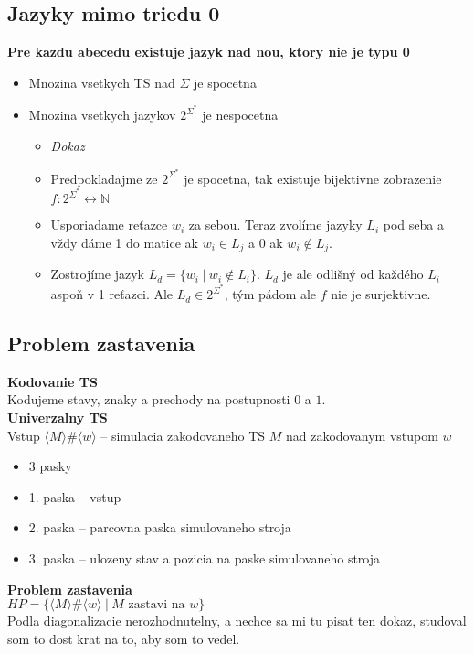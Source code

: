 \documentclass[12pt]{article}
\newcommand{\pipesep}{\hspace{3pt} \vert \hspace{3pt}}
\begin{document}
\subsection*{Jazyky mimo triedu 0}
\textbf{Pre kazdu abecedu existuje jazyk nad nou, ktory nie je typu 0}
\begin{itemize}
	\item Mnozina vsetkych TS nad $\Sigma$ je spocetna
	\item Mnozina vsetkych jazykov $2^{\Sigma^{*}}$ je nespocetna
		\begin{itemize}
			\item \emph{Dokaz}
			\item Predpokladajme ze $2^{\Sigma^{*}}$ je spocetna, tak existuje bijektivne zobrazenie $f: 2^{\Sigma^{*}} \leftrightarrow \mathbb{N}$
			\item Usporiadame reťazce $w_{i}$ za sebou. Teraz zvolíme jazyky $L_{i}$ pod seba a vždy dáme 1 do matice ak $w_{i} \in L_{j}$ a $0$ ak $w_{i} \not\in L_{j}$.
			\item Zostrojíme jazyk $L_{d} = \{ w_{i} \pipesep w_{i} \not\in L_{i}\}$. $L_{d}$ je ale odlišný od každého $L_{i}$ aspoň v 1 reťazci. Ale $L_{d} \in 2^{\Sigma^{*}}$,
				tým pádom ale $f$ nie je surjektivne.
		\end{itemize}
\end{itemize}

\subsection*{Problem zastavenia}
\textbf{Kodovanie TS}\\
Kodujeme stavy, znaky a prechody na postupnosti $0$ a $1$.\\
\textbf{Univerzalny TS}\\
Vstup $\langle M \rangle \# \langle w \rangle$ -- simulacia zakodovaneho TS $M$ nad zakodovanym vstupom $w$
\begin{itemize}
	\item 3 pasky
	\item 1. paska -- vstup
	\item 2. paska -- parcovna paska simulovaneho stroja
	\item 3. paska -- ulozeny stav a pozicia na paske simulovaneho stroja
\end{itemize}
\textbf{Problem zastavenia}\\
$HP = \{\langle M \rangle \# \langle w \rangle \pipesep M\text{ zastavi na }w\}$\\
Podla diagonalizacie nerozhodnutelny, a nechce sa mi tu pisat ten dokaz, studoval som to dost krat na to, aby som to vedel. \\
\end{document}
